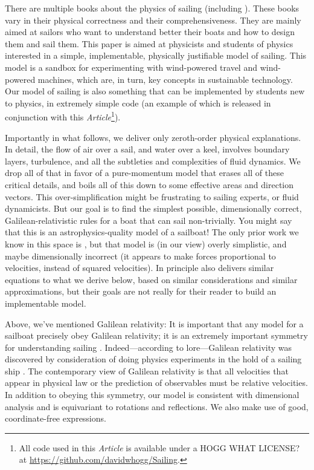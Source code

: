 \documentclass[letterpaper]{article}
\newcommand{\documentname}{\textsl{Article}}
\begin{document}
There are multiple books about the physics of sailing (including \cite{symmetry, explained, sails, pos}).
These books vary in their physical correctness and their comprehensiveness.
They are mainly aimed at sailors who want to understand better their boats and how to design them and sail them.
This paper is aimed at physicists and students of physics interested in a simple, implementable, physically justifiable model of sailing.
This model is a sandbox for experimenting with wind-powered travel and wind-powered machines, which are, in turn, key concepts in sustainable technology.
Our model of sailing is also something that can be implemented by students new to physics, in extremely simple code (an example of which is released in conjunction with this \documentname\footnote{All code used in this \documentname{} is available under a HOGG WHAT LICENSE? at \url{https://github.com/davidwhogg/Sailing}.}).

Importantly in what follows, we deliver only zeroth-order physical explanations.
In detail, the flow of air over a sail, and water over a keel, involves boundary layers, turbulence, and all the subtleties and complexities of fluid dynamics.
We drop all of that in favor of a pure-momentum model that erases all of these critical details, and boils all of this down to some effective areas and direction vectors.
This over-simplification might be frustrating to sailing experts, or fluid dynamicists.
But our goal is to find the simplest possible, dimensionally correct, Galilean-relativistic rules for a boat that can sail non-trivially.
You might say that this is an astrophysics-quality model of a sailboat!
The only prior work we know in this space is \cite{tao}, but that model is (in our view) overly simplistic, and maybe dimensionally incorrect (it appears to make forces proportional to velocities, instead of squared velocities).
In principle also \cite{pos} delivers similar equations to what we derive below, based on similar considerations and similar approximations, but their goals are not really for their reader to build an implementable model.

Above, we've mentioned Galilean relativity:
It is important that any model for a sailboat precisely obey Galilean relativity; it is an extremely important symmetry for understanding sailing \cite{symmetry}.
Indeed---according to lore---Galilean relativity was discovered by consideration of doing physics experiments in the hold of a sailing ship \cite{galileo}.
The contemporary view of Galilean relativity is that all velocities that appear in physical law or the prediction of observables must be relative velocities.
In addition to obeying this symmetry, our model is consistent with dimensional analysis and is equivariant to rotations and reflections.
We also make use of good, coordinate-free expressions.
\end{document}
